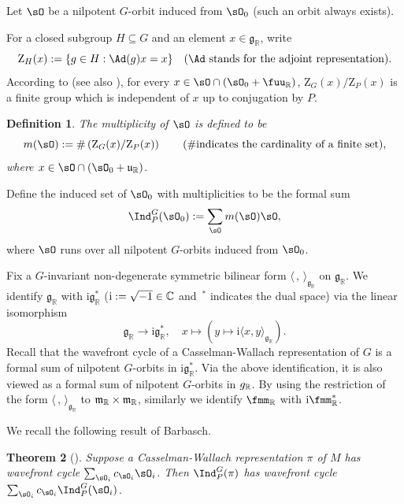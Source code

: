 \documentclass[11pt,a4paper]{amsart}
\newcommand{\g}{\mathfrak g}
\newcommand{\R}{\mathbb R}
\newcommand{\la}{\langle}
\newcommand{\ra}{\rangle}
\newcommand{\be}{\begin {equation}}
\newcommand{\ee}{\end {equation}}
\numberwithin{equation}{section}
\newtheorem{thm}{Theorem}[section]
\newtheorem{defn}[thm]{Definition}
\theoremstyle{remark}
\def\subset{\subseteq}
\begin{document}
Let  $\sO$ be a nilpotent $G$-orbit induced  from $\sO_0$ (such an orbit always exists). 

For a closed subgroup $H\subseteq G$ and an element $x\in \g_\R$, write 
\[
\mathrm Z_H(x):=\{g\in H:\Ad(g)x=x\} \quad(\textrm{$\Ad$ stands for the adjoint representation}). 
\]
According to \cite[103]{B.Orbit} (see also \cite[p443]{MW}), for every $x\in \sO \cap (\sO_0 +\fuu_\R)$, $\mathrm Z_G(x)/ \mathrm Z_P(x)$ is a finite group which is independent of $x$ up to conjugation by $P$.  %
\begin{defn}\label{def:mult}
The \emph{multiplicity} of $\sO$ is defined to be 
\[
m(\sO) := \#\left(\mathrm Z_G(x)/ \mathrm Z_P(x)\right) \qquad (\# \textrm{indicates the cardinality of a finite set}),
\]
where $x\in {\sO}\cap(\sO_0+\mathfrak u_\R)$. 
\end{defn}


Define the induced set of $\sO_0$ with multiplicities to be the formal sum 
\[\Ind_P^G(\sO_0) := \sum_{\sO} m(\sO) \sO,\] 
where $\sO$ runs over all nilpotent $G$-orbits induced  from $\sO_0$. 

Fix a $G$-invariant non-degenerate symmetric bilinear form $\la\,,\,\ra_{\g_\R}$ on $\g_\R$. We identify $\g_\R$ with $\mathrm i\g_\R^*$ ($\mathrm i:=\sqrt{-1}\in \mathbb{C}$ and $\,^*$ indicates the dual space) via the linear isomorphism
\be\label{idg}
  \g_\R\rightarrow \mathrm i\g_\R^*, \quad x\mapsto (y\mapsto \mathrm i\la x,y\ra_{\g_\R}). 
\ee
Recall that the wavefront cycle of a Casselman-Wallach  representation  of $G$ is a formal sum of nilpotent $G$-orbits in $\mathrm i\g_\R^*$. Via the above identification, it is also viewed as a formal sum of  nilpotent $G$-orbits in $\mathrm \g_\R$. By using the restriction of the form $\la\,,\,\ra_{\g_\R}$ to $\frak m_\R\times \frak m_\R$, similarly we identify $\fmm_\R$ with $\mathrm i\fmm_\R^*$. 

We recall the following result of Barbasch. 
\begin{thm}[{\cite[Corollary 5.0.10]{B.Orbit}}]\label{thm:A3}
 Suppose a Casselman-Wallach  representation $\pi$ of $M$ has wavefront cycle $\sum_{\sO_i} c_{\sO_i} \sO_i$. 
 Then $\Ind_P^G (\pi)$ has wavefront cycle 
 $\sum_{\sO_i} c_{\sO_i}\Ind_P^G (\sO_i)$. 
\end{thm}
\end{document}
